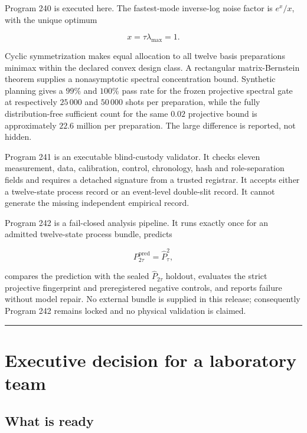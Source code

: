 \documentclass[11pt,a4paper,openany]{report}
\begin{document}
Program 240 is executed here. The fastest-mode inverse-log noise factor is \(e^x/x\), with the unique optimum

\[
x=\tau\lambda_{\max}=1.
\]

Cyclic symmetrization makes equal allocation to all twelve basis preparations minimax within the declared convex design class. A rectangular matrix-Bernstein theorem supplies a nonasymptotic spectral concentration bound. Synthetic planning gives a \(99\%\) and \(100\%\) pass rate for the frozen projective spectral gate at respectively \(25\,000\) and \(50\,000\) shots per preparation, while the fully distribution-free sufficient count for the same \(0.02\) projective bound is approximately \(22.6\) million per preparation. The large difference is reported, not hidden.

Program 241 is an executable blind-custody validator. It checks eleven measurement, data, calibration, control, chronology, hash and role-separation fields and requires a detached signature from a trusted registrar. It accepts either a twelve-state process record or an event-level double-slit record. It cannot generate the missing independent empirical record.

Program 242 is a fail-closed analysis pipeline. It runs exactly once for an admitted twelve-state process bundle, predicts

\[
P_{2\tau}^{\mathrm{pred}}=\widehat P_\tau^2,
\]

compares the prediction with the sealed \(\widehat P_{2\tau}\) holdout, evaluates the strict projective fingerprint and preregistered negative controls, and reports failure without model repair. No external bundle is supplied in this release; consequently Program 242 remains locked and no physical validation is claimed.

\par\medskip\hrule\medskip

\chapter{Executive decision for a laboratory team}

\section{What is ready}
\end{document}
